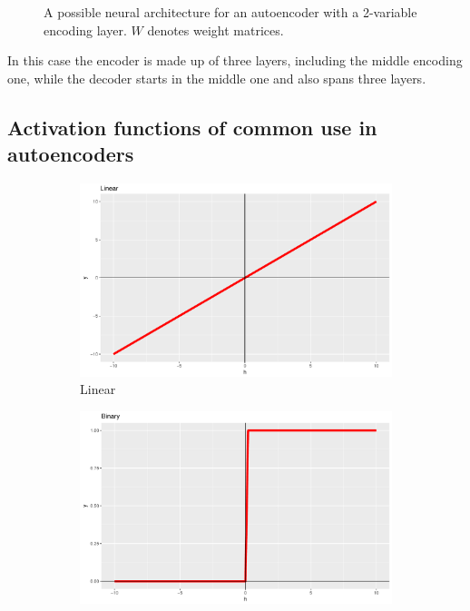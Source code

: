 \begin{figure}[ht!]
{  }
  \caption[Sample autoencoder]{A possible neural architecture for an autoencoder with a 2-variable encoding layer. $W$ denotes weight matrices.}
  \label{fig:ae-example}
\end{figure}

In this case the encoder is made up of three layers, including the middle encoding one, while the decoder starts in the middle one and also spans three layers. 

\subsection{Activation functions of common use in autoencoders}
\begin{figure}[htp!]
	\centering
	\begin{subfigure}[t]{0.3\figwidth}
		\centering
		\includegraphics[width=\linewidth]{Linear.pdf} 
		\caption{Linear} \label{Fig.Linear}
	\end{subfigure}
	\begin{subfigure}[t]{0.3\figwidth}
		\centering
		\includegraphics[width=\linewidth]{Binary.pdf} 

\end{subfigure}
\end{figure}
